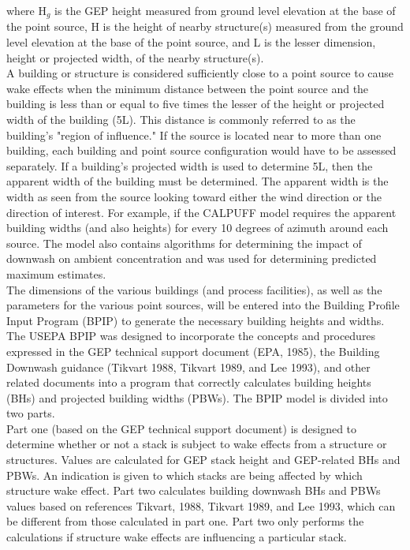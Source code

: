 \noindent
where H$_{g}$ is the GEP height measured from ground level elevation at the base of the point source, H is the height of nearby structure(s) measured from the ground level elevation at the base of the point source, and L is the lesser dimension, height or projected width, of the nearby structure(s). \\

A building or structure is considered sufficiently close to a point source to cause wake effects when the minimum distance between the point source and the building is less than or equal to five times the lesser of the height or projected width of the building (5L). This distance is commonly referred to as the building's "region of influence." If the source is located near to more than one building, each building and point source configuration would have to be assessed separately. If a building's projected width is used to determine 5L, then the apparent width of the building must be determined. The apparent width is the width as seen from the source looking toward either the wind direction or the direction of interest. For example, if the CALPUFF model requires the apparent building widths (and also heights) for every 10 degrees of azimuth around each source. The model also contains algorithms for determining the impact of downwash on ambient concentration and was used for determining predicted maximum estimates.\\

The dimensions of the various buildings (and process facilities), as well as the parameters for the various point sources, will be entered into the Building Profile Input Program (BPIP) to generate the necessary building heights and widths. The USEPA BPIP was designed to incorporate the concepts and procedures expressed in the GEP technical support document (EPA, 1985), the Building Downwash guidance (Tikvart 1988, Tikvart 1989, and Lee 1993), and other related documents into a program that correctly calculates building heights (BHs) and projected building widths (PBWs). The BPIP model is divided into two parts.\\

Part one (based on the GEP technical support document) is designed to determine whether or not a stack is subject to wake effects from a structure or structures. Values are calculated for GEP stack height and GEP-related BHs and PBWs. An indication is given to which stacks are being affected by which structure wake effect. Part two calculates building downwash BHs and PBWs values based on references Tikvart, 1988, Tikvart 1989, and Lee 1993, which can be different from those calculated in part one. Part two only performs the calculations if structure wake effects are influencing a particular stack.\\

